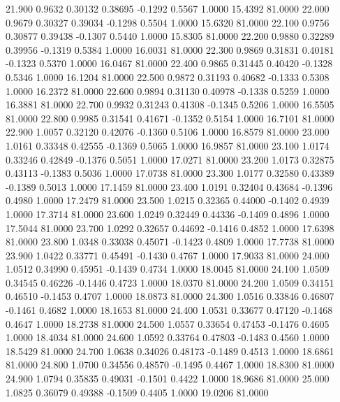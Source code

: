   21.900   0.9632   0.30132   0.38695  -0.1292   0.5567   1.0000  15.4392  81.0000
  22.000   0.9679   0.30327   0.39034  -0.1298   0.5504   1.0000  15.6320  81.0000
  22.100   0.9756   0.30877   0.39438  -0.1307   0.5440   1.0000  15.8305  81.0000
  22.200   0.9880   0.32289   0.39956  -0.1319   0.5384   1.0000  16.0031  81.0000
  22.300   0.9869   0.31831   0.40181  -0.1323   0.5370   1.0000  16.0467  81.0000
  22.400   0.9865   0.31445   0.40420  -0.1328   0.5346   1.0000  16.1204  81.0000
  22.500   0.9872   0.31193   0.40682  -0.1333   0.5308   1.0000  16.2372  81.0000
  22.600   0.9894   0.31130   0.40978  -0.1338   0.5259   1.0000  16.3881  81.0000
  22.700   0.9932   0.31243   0.41308  -0.1345   0.5206   1.0000  16.5505  81.0000
  22.800   0.9985   0.31541   0.41671  -0.1352   0.5154   1.0000  16.7101  81.0000
  22.900   1.0057   0.32120   0.42076  -0.1360   0.5106   1.0000  16.8579  81.0000
  23.000   1.0161   0.33348   0.42555  -0.1369   0.5065   1.0000  16.9857  81.0000
  23.100   1.0174   0.33246   0.42849  -0.1376   0.5051   1.0000  17.0271  81.0000
  23.200   1.0173   0.32875   0.43113  -0.1383   0.5036   1.0000  17.0738  81.0000
  23.300   1.0177   0.32580   0.43389  -0.1389   0.5013   1.0000  17.1459  81.0000
  23.400   1.0191   0.32404   0.43684  -0.1396   0.4980   1.0000  17.2479  81.0000
  23.500   1.0215   0.32365   0.44000  -0.1402   0.4939   1.0000  17.3714  81.0000
  23.600   1.0249   0.32449   0.44336  -0.1409   0.4896   1.0000  17.5044  81.0000
  23.700   1.0292   0.32657   0.44692  -0.1416   0.4852   1.0000  17.6398  81.0000
  23.800   1.0348   0.33038   0.45071  -0.1423   0.4809   1.0000  17.7738  81.0000
  23.900   1.0422   0.33771   0.45491  -0.1430   0.4767   1.0000  17.9033  81.0000
  24.000   1.0512   0.34990   0.45951  -0.1439   0.4734   1.0000  18.0045  81.0000
  24.100   1.0509   0.34545   0.46226  -0.1446   0.4723   1.0000  18.0370  81.0000
  24.200   1.0509   0.34151   0.46510  -0.1453   0.4707   1.0000  18.0873  81.0000
  24.300   1.0516   0.33846   0.46807  -0.1461   0.4682   1.0000  18.1653  81.0000
  24.400   1.0531   0.33677   0.47120  -0.1468   0.4647   1.0000  18.2738  81.0000
  24.500   1.0557   0.33654   0.47453  -0.1476   0.4605   1.0000  18.4034  81.0000
  24.600   1.0592   0.33764   0.47803  -0.1483   0.4560   1.0000  18.5429  81.0000
  24.700   1.0638   0.34026   0.48173  -0.1489   0.4513   1.0000  18.6861  81.0000
  24.800   1.0700   0.34556   0.48570  -0.1495   0.4467   1.0000  18.8300  81.0000
  24.900   1.0794   0.35835   0.49031  -0.1501   0.4422   1.0000  18.9686  81.0000
  25.000   1.0825   0.36079   0.49388  -0.1509   0.4405   1.0000  19.0206  81.0000
